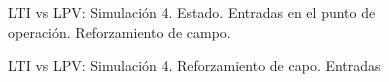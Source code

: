 \documentclass[a4paper, 10pt, onecolumn,journal]{ieeeconf}
\begin{document}
\begin{figure}[thpb]
	\centering
	\begin{adjustbox}{max width=\columnwidth}
	\end{adjustbox}
	\caption{LTI vs LPV: Simulación 4. Estado. Entradas en el punto de operación. Reforzamiento de campo.}
	\label{simulación 4 estado}
\end{figure}

\begin{figure}[thpb]
	\centering
	\begin{adjustbox}{max width=\columnwidth}
	\end{adjustbox}
	\caption{LTI vs LPV: Simulación 4. Reforzamiento de capo. Entradas}
	\label{simulación 4 entradas}
\end{figure}
\end{document}
